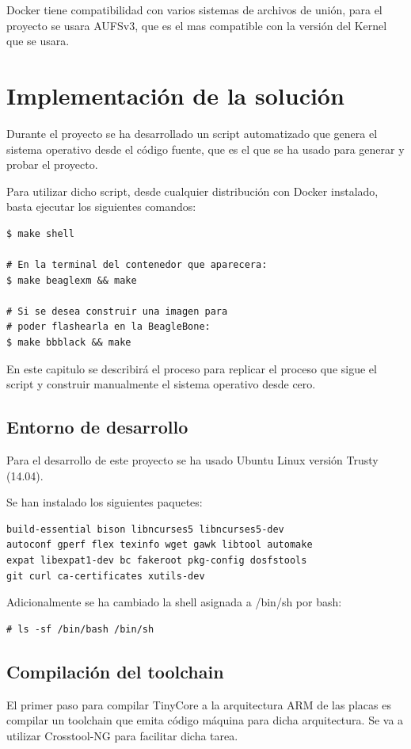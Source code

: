 \documentclass{tfg}
\begin{document}
Docker tiene compatibilidad con varios sistemas de archivos de unión, para el proyecto se usara AUFSv3, que es el mas compatible con la versión del Kernel que se usara.

\chapter{Implementación de la solución}
Durante el proyecto se ha desarrollado un script automatizado que genera el sistema operativo desde el código fuente, que es el que se ha usado para generar y probar el proyecto.

Para utilizar dicho script, desde cualquier distribución con Docker instalado, basta ejecutar los siguientes comandos:
\begin{lstlisting}[caption=Uso del build-script]
$ make shell

# En la terminal del contenedor que aparecera:
$ make beaglexm && make

# Si se desea construir una imagen para
# poder flashearla en la BeagleBone:
$ make bbblack && make
\end{lstlisting}
%

En este capitulo se describirá el proceso para replicar el proceso que sigue el script y construir manualmente el sistema operativo desde cero.
\section{Entorno de desarrollo}
Para el desarrollo de este proyecto se ha usado Ubuntu Linux versión Trusty (14.04).

Se han instalado los siguientes paquetes:
\begin{lstlisting}[caption=Lista de paquetes]
build-essential bison libncurses5 libncurses5-dev
autoconf gperf flex texinfo wget gawk libtool automake
expat libexpat1-dev bc fakeroot pkg-config dosfstools
git curl ca-certificates xutils-dev
\end{lstlisting}

Adicionalmente se ha cambiado la shell asignada a /bin/sh por bash:
\begin{lstlisting}[caption=Cambio de shell /bin/sh]
# ls -sf /bin/bash /bin/sh
\end{lstlisting}

\section{Compilación del toolchain}
El primer paso para compilar TinyCore a la arquitectura ARM de las placas es compilar un toolchain que emita código
máquina para dicha arquitectura. Se va a utilizar Crosstool-NG para facilitar dicha tarea.
\end{document}
